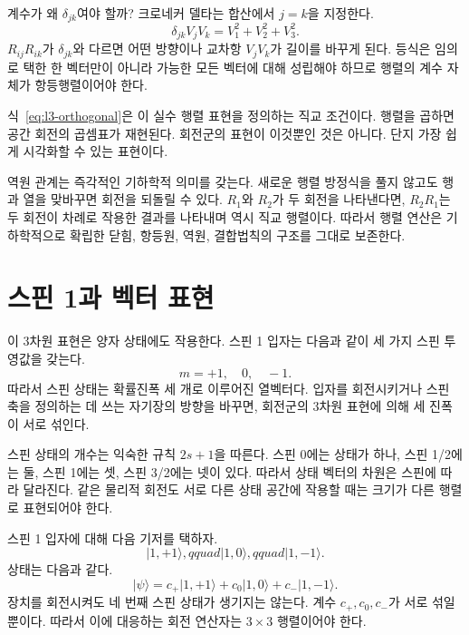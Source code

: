 계수가 왜 \(\delta_{jk}\)여야 할까? 크로네커 델타는 합산에서 \(j=k\)을 지정한다.
\begin{equation}
\delta_{jk}V_jV_k=V_1^2+V_2^2+V_3^2.
\end{equation}
\(R_{ij}R_{ik}\)가 \(\delta_{jk}\)와 다르면 어떤 방향이나 교차항 \(V_jV_k\)가 길이를 바꾸게 된다. 등식은 임의로 택한 한 벡터만이 아니라 가능한 모든 벡터에 대해 성립해야 하므로 행렬의 계수 자체가 항등행렬이어야 한다.

식~\eqref{eq:l3-orthogonal}은 이 실수 행렬 표현을 정의하는 직교 조건이다. 행렬을 곱하면 공간 회전의 곱셈표가 재현된다. 회전군의 표현이 이것뿐인 것은 아니다. 단지 가장 쉽게 시각화할 수 있는 표현이다.

역원 관계는 즉각적인 기하학적 의미를 갖는다. 새로운 행렬 방정식을 풀지 않고도 행과 열을 맞바꾸면 회전을 되돌릴 수 있다. \(R_1\)와 \(R_2\)가 두 회전을 나타낸다면, \(R_2R_1\)는 두 회전이 차례로 작용한 결과를 나타내며 역시 직교 행렬이다. 따라서 행렬 연산은 기하학적으로 확립한 닫힘, 항등원, 역원, 결합법칙의 구조를 그대로 보존한다.

\section{스핀 1과 벡터 표현}

이 3차원 표현은 양자 상태에도 작용한다. 스핀 1 입자는 다음과 같이 세 가지 스핀 투영값을 갖는다.
\begin{equation}
m=+1,\quad 0,\quad -1.
\end{equation}
따라서 스핀 상태는 확률진폭 세 개로 이루어진 열벡터다. 입자를 회전시키거나 스핀 축을 정의하는 데 쓰는 자기장의 방향을 바꾸면, 회전군의 3차원 표현에 의해 세 진폭이 서로 섞인다.

스핀 상태의 개수는 익숙한 규칙 \(2s+1\)을 따른다. 스핀 0에는 상태가 하나, 스핀 1/2에는 둘, 스핀 1에는 셋, 스핀 3/2에는 넷이 있다. 따라서 상태 벡터의 차원은 스핀에 따라 달라진다. 같은 물리적 회전도 서로 다른 상태 공간에 작용할 때는 크기가 다른 행렬로 표현되어야 한다.

스핀 1 입자에 대해 다음 기저를 택하자.
\begin{equation}
\lvert 1,+1\rangle,qquad
\lvert 1,0\rangle,qquad
\lvert 1,-1\rangle.
\end{equation}
상태는 다음과 같다.
\begin{equation}
\lvert\psi\rangle
=c_{+}\lvert1,+1\rangle+c_0\lvert1,0\rangle+c_{-}\lvert1,-1\rangle.
\end{equation}
장치를 회전시켜도 네 번째 스핀 상태가 생기지는 않는다. 계수 \(c_+,c_0,c_-\)가 서로 섞일 뿐이다. 따라서 이에 대응하는 회전 연산자는 \(3\times3\) 행렬이어야 한다.


